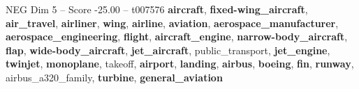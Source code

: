 \begin{textsample}{NEG Dim 5 – Score -25.00 – t007576}  \label{ex:f5_neg_003}
\textbf{aircraft}, \textbf{fixed-wing\_aircraft}, \textbf{air\_travel}, \textbf{airliner}, \textbf{wing}, \textbf{airline}, \textbf{aviation}, \textbf{aerospace\_manufacturer}, \textbf{aerospace\_engineering}, \textbf{flight}, \textbf{aircraft\_engine}, \textbf{narrow-body\_aircraft}, \textbf{flap}, \textbf{wide-body\_aircraft}, \textbf{jet\_aircraft}, public\_transport, \textbf{jet\_engine}, \textbf{twinjet}, \textbf{monoplane}, takeoff, \textbf{airport}, \textbf{landing}, \textbf{airbus}, \textbf{boeing}, \textbf{fin}, \textbf{runway}, airbus\_a320\_family, \textbf{turbine}, \textbf{general\_aviation}

\end{textsample}

